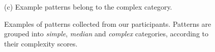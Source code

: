 \begin{figure}[!t]
{\begin{minipage}[b]{8cm}
                \centering \footnotesize (c) Example patterns belong to the complex category.
                \end{minipage}
            }
            \caption{Examples of patterns collected from our participants. Patterns are grouped into \emph{simple}, \emph{median} and \emph{complex} categories, according to their complexity scores. }
            \label{fig:fig8}
            \vspace{-3mm}
        \end{figure}

        \begin{figure}[!t]
            \centering
\end{figure}
